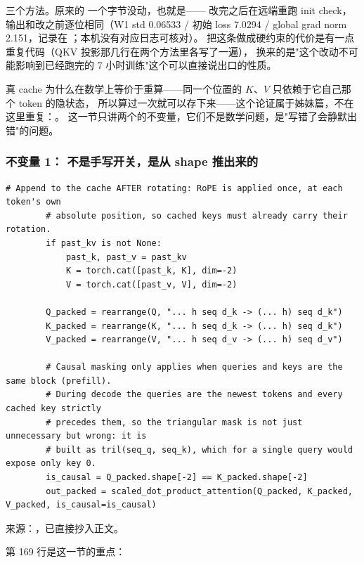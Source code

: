 三个方法。原来的  一个字节没动，也就是——
改完之后在远端重跑 init check，输出和改之前逐位相同（W1 std 0.06533 / 初始 loss 7.0294 /
global grad norm 2.151，记录在 ；本机没有对应日志可核对）。
把这条做成硬约束的代价是有一点重复代码（QKV 投影那几行在两个方法里各写了一遍），
换来的是"这个改动不可能影响到已经跑完的 7 小时训练"这个可以直接说出口的性质。

真 cache 为什么在数学上等价于重算——同一个位置的 $K$、$V$ 只依赖于它自己那个 token 的隐状态，
所以算过一次就可以存下来——这个论证属于姊妹篇，不在这里重复：。
这一节只讲两个的不变量，它们不是数学问题，是"写错了会静默出错"的问题。

\subsubsection{不变量 1： 不是手写开关，是从 shape 推出来的}

\begin{lstlisting}[style=hlnum, firstnumber=154]
        # Append to the cache AFTER rotating: RoPE is applied once, at each token's own
        # absolute position, so cached keys must already carry their rotation.
        if past_kv is not None:
            past_k, past_v = past_kv
            K = torch.cat([past_k, K], dim=-2)
            V = torch.cat([past_v, V], dim=-2)

        Q_packed = rearrange(Q, "... h seq d_k -> (... h) seq d_k")
        K_packed = rearrange(K, "... h seq d_k -> (... h) seq d_k")
        V_packed = rearrange(V, "... h seq d_v -> (... h) seq d_v")

        # Causal masking only applies when queries and keys are the same block (prefill).
        # During decode the queries are the newest tokens and every cached key strictly
        # precedes them, so the triangular mask is not just unnecessary but wrong: it is
        # built as tril(seq_q, seq_k), which for a single query would expose only key 0.
        is_causal = Q_packed.shape[-2] == K_packed.shape[-2]
        out_packed = scaled_dot_product_attention(Q_packed, K_packed, V_packed, is_causal=is_causal)
\end{lstlisting}
\noindent 来源：，已直接抄入正文。

第 169 行是这一节的重点：

\begin{center}
\end{center}

